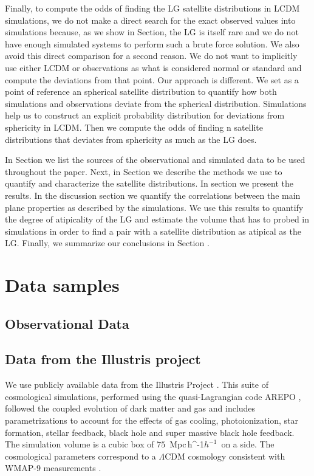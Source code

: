 \documentclass[a4paper,fleqn,usenatbib]{mnras}
\newcommand{\Mpch}{\,{\rm Mpc}\,\ifmmode h^{-1}\else $h^{-1}$\fi}
\begin{document}
Finally, to compute the odds of finding the LG satellite distributions 
in LCDM simulations, we do not make a direct search for the exact
observed values into simulations because, as we show in Section, the
LG is itself rare and we do not have enough simulated systems to
perform such a brute force solution. 
We also avoid this direct comparison for a second reason. 
We do not want to implicitly use either LCDM or observations as what
is considered normal or standard and compute the deviations from that
point. 
Our approach is different. 
We set as a point of reference an spherical satellite
distribution to quantify how both simulations and observations
deviate from the spherical distribution.
Simulations help us to construct an explicit probability distribution
for deviations from sphericity in LCDM.
Then we compute the odds of finding n satellite distributions that
deviates from sphericity as much as the LG does. 

In Section we list the sources of the observational and
simulated data to be used throughout the paper.
Next, in Section we describe the methods we use to quantify and
characterize the satellite distributions.
In section we present the results. 
In the discussion section we quantify the correlations between the main
plane properties as described by the simulations.
We use this results to quantify the degree of atipicality of the LG
and estimate the volume that has to probed in simulations in order to
find a pair with a satellite distribution as atipical as the LG. 
Finally, we summarize our conclusions in Section .


\section{Data samples}

\subsection{Observational Data}
\label{sec:obs}




\subsection{Data from the Illustris project}
\label{sec:illustris}

We use publicly available data from the Illustris Project 
\citep{2014MNRAS.444.1518V}. 
This suite of cosmological simulations, performed using the quasi-Lagrangian
code AREPO \citep{2010MNRAS.401..791S}, followed the coupled evolution of dark 
matter and gas and includes parametrizations to account for the effects of
gas cooling, photoionization, star formation, stellar feedback, black
hole and super massive black hole feedback. 
The simulation volume is a cubic box of $75$ \Mpch\ on a side.
The cosmological parameters correspond to a $\Lambda$CDM cosmology
consistent with WMAP-9 measurements \citep{2013ApJS..208...19H}. 
\end{document}
